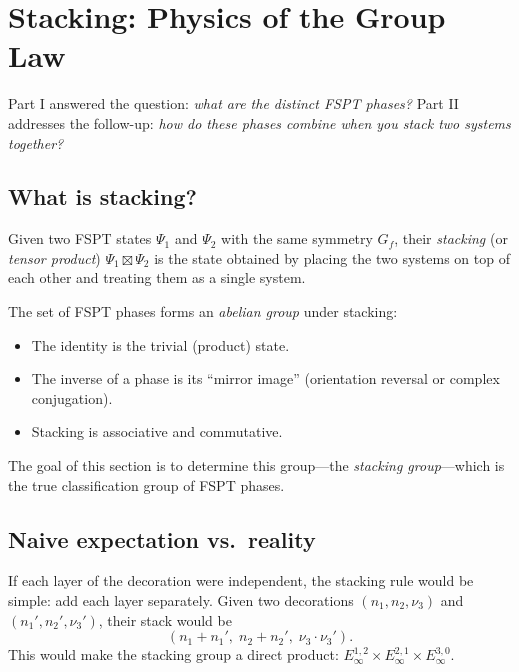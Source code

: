\documentclass{SciPost}
\theoremstyle{definition}
\newcommand{\Gf}{G_f}
\begin{document}
\section{Stacking: Physics of the Group Law}
\label{sec:stacking-physics}

Part I answered the question: \emph{what are the distinct FSPT phases?}
Part II addresses the follow-up: \emph{how do these phases combine when you stack two systems together?}

\subsection{What is stacking?}
\label{subsec:what-is-stacking}

Given two FSPT states $\Psi_1$ and $\Psi_2$ with the same symmetry $\Gf$, their \emph{stacking} (or \emph{tensor product}) $\Psi_1 \boxtimes \Psi_2$ is the state obtained by placing the two systems on top of each other and treating them as a single system.

The set of FSPT phases forms an \emph{abelian group} under stacking:
\begin{itemize}
    \item The identity is the trivial (product) state.
    \item The inverse of a phase is its ``mirror image'' (orientation reversal or complex conjugation).
    \item Stacking is associative and commutative.
\end{itemize}
The goal of this section is to determine this group---the \emph{stacking group}---which is the true classification group of FSPT phases.

\subsection{Naive expectation vs.\ reality}
\label{subsec:naive-vs-reality}

If each layer of the decoration were independent, the stacking rule would be simple: add each layer separately.
Given two decorations $(n_1, n_2, \nu_3)$ and $(n_1', n_2', \nu_3')$, their stack would be
\begin{equation}
(n_1 + n_1',\; n_2 + n_2',\; \nu_3 \cdot \nu_3').
\end{equation}
This would make the stacking group a direct product: $E_\infty^{1,2} \times E_\infty^{2,1} \times E_\infty^{3,0}$.
\end{document}
